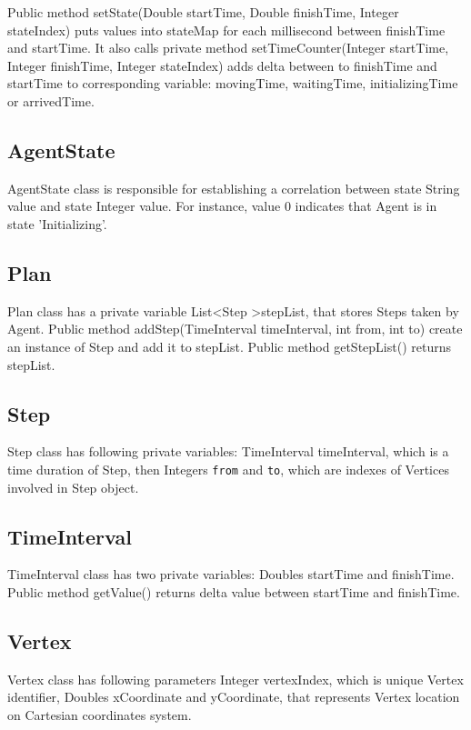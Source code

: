 \documentclass[thesis=B,english]{FITthesis}[2019/12/23]
\begin{document}
Public method setState(Double startTime, Double finishTime, Integer stateIndex) puts values into stateMap for each millisecond between finishTime and startTime. It also calls private method setTimeCounter(Integer startTime, Integer finishTime, Integer stateIndex) adds delta between to finishTime and startTime to corresponding variable:
movingTime, waitingTime, initializingTime or arrivedTime.

\subsection{AgentState}

AgentState class is responsible for establishing a correlation between state String value and state Integer value. For instance, value 0 indicates that Agent is in state 'Initializing'.

\subsection{Plan}

Plan class has a private variable List\textless Step \textgreater stepList, that stores Steps taken by Agent. Public method addStep(TimeInterval timeInterval, int from, int to) create an instance of Step and add it to stepList. Public method getStepList() returns stepList. 

\subsection{Step}

Step class has following private variables: TimeInterval timeInterval, which is a time duration of Step, then Integers \verb|from| and \verb|to|, which are indexes of Vertices involved in Step object.

\subsection{TimeInterval}

TimeInterval class has two private variables: Doubles startTime and finishTime.
Public method getValue() returns delta value between startTime and finishTime. 

\subsection{Vertex}

Vertex class has following parameters Integer vertexIndex, which is unique Vertex identifier, Doubles xCoordinate and yCoordinate, that represents Vertex location on Cartesian coordinates system.
\end{document}
